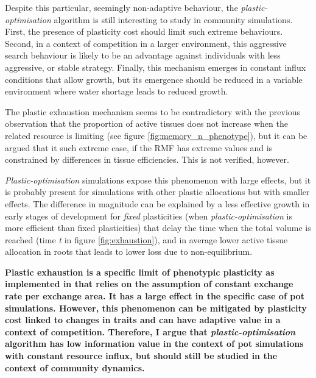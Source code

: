Despite this particular, seemingly non-adaptive behaviour, the \textit{plastic-optimisation} algorithm is still interesting to study in community simulations. First, the presence of plasticity cost should limit such extreme behaviours. Second, in a context of competition in a larger environment, this aggressive search behaviour is likely to be an advantage against individuals with less aggressive, or stable strategy. Finally, this mechanism emerges in constant influx conditions that allow growth, but its emergence should be reduced in a variable environment where water shortage leads to reduced growth.

The plastic exhaustion mechanism seems to be contradictory with the previous observation that the proportion of active tissues does not increase when the related resource is limiting (see figure \ref{fig:memory_n_phenotype}), but it can be argued that it such extreme case, if the RMF has extreme values and is constrained by differences in tissue efficiencies. This is not verified, however.

\textit{Plastic-optimisation} simulations expose this phenomenon with large effects, but it is probably present for simulations with other plastic allocations but with smaller effects. The difference in magnitude can be explained by a less effective growth in early stages of development for \textit{fixed} plasticities (when \textit{plastic-optimisation} is more efficient than fixed plasticities) that delay the time when the total volume is reached (time \textit{t} in figure \ref{fig:exhaustion}), and in average lower active tissue allocation in roots that leads to lower loss due to non-equilibrium.

\textbf{Plastic exhaustion is a specific limit of phenotypic plasticity as implemented in \model that relies on the assumption of constant exchange rate per exchange area. It has a large effect in the specific case of pot simulations. However, this phenomenon can be mitigated by plasticity cost linked to changes in traits and can have adaptive value in a context of competition. Therefore, I argue that \textit{plastic-optimisation} algorithm  has low information value in the context of pot simulations with constant resource influx, but should still be studied in the context of community dynamics.}

%
%


